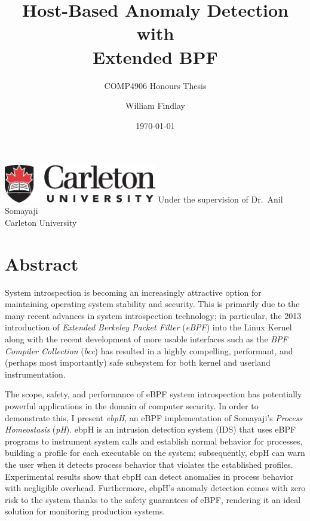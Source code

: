 \documentclass[
  12pt]{findlay}
\title{Host-Based Anomaly Detection\\
with\\
Extended BPF}
\subtitle{COMP4906 Honours Thesis}
\author{William Findlay}
\date{\today}
\begin{document}
\pagestyle{fancy}

\maketitle
\thispagestyle{empty}

\begin{center}
    \large
    \vfill
    \includegraphics[width=0.5\textwidth]{logo/CarletonWide_K_186}
    \vfill
    Under the supervision of Dr.\ Anil Somayaji\\
    Carleton University
    \vfill
\end{center}

\onehalfspacing

\clearpage
{}
\section*{Abstract}

System introspection is becoming an increasingly attractive option for
maintaining operating system stability and security. This is primarily
due to the many recent advances in system introspection technology; in
particular, the 2013 introduction of \emph{Extended Berkeley Packet
Filter} (\emph{eBPF}) into the Linux Kernel
\autocite{starovoitov13,starovoitov14} along with the recent development
of more usable interfaces such as the \emph{BPF Compiler Collection}
(\emph{bcc}) \autocite{bcc} has resulted in a highly compelling,
performant, and (perhaps most importantly) safe subsystem for both
kernel and userland instrumentation.

The scope, safety, and performance of eBPF system introspection has
potentially powerful applications in the domain of computer security. In
order to demonstrate this, I present \emph{ebpH}, an eBPF implementation
of Somayaji's \autocite{soma02} \emph{Process Homeostasis} (\emph{pH}).
ebpH is an intrusion detection system (IDS) that uses eBPF programs to
instrument system calls and establish normal behavior for processes,
building a profile for each executable on the system; subsequently, ebpH
can warn the user when it detects process behavior that violates the
established profiles. Experimental results show that ebpH can detect
anomalies in process behavior with negligible overhead. Furthermore,
ebpH's anomaly detection comes with zero risk to the system thanks to
the safety guarantees of eBPF, rendering it an ideal solution for
monitoring production systems.
\end{document}
